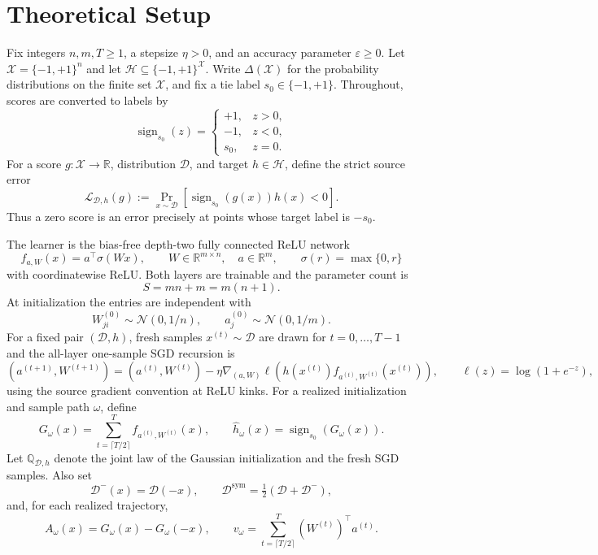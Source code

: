 \section{Theoretical Setup}
\label{sec:setup}

Fix integers $n,m,T\geq 1$, a stepsize $\eta>0$, and an accuracy
parameter $\varepsilon\geq 0$.  Let
$\mathcal X=\{-1,+1\}^{n}$ and let
$\mathcal H\subseteq\{-1,+1\}^{\mathcal X}$.  Write
$\Delta(\mathcal X)$ for the probability distributions on the finite set
$\mathcal X$, and fix a tie label $s_0\in\{-1,+1\}$.  Throughout, scores are
converted to labels by
\[
\operatorname{sign}_{s_0}(z)=
\begin{cases}
 +1,&z>0,\\
 -1,&z<0,\\
 s_0,&z=0.
\end{cases}
\]
For a score $g:\mathcal X\to\mathbb R$, distribution $\mathcal D$, and
target $h\in\mathcal H$, define the strict source error
\[
\mathcal L_{\mathcal D,h}(g)
 :=\Pr_{x\sim\mathcal D}\left[
 \operatorname{sign}_{s_0}(g(x))h(x)<0\right].
\]
Thus a zero score is an error precisely at points whose target label is
$-s_0$.

The learner is the bias-free depth-two fully connected ReLU network
\[
 f_{a,W}(x)=a^\top\sigma(Wx),\qquad
 W\in\mathbb R^{m\times n},\quad a\in\mathbb R^m,
 \qquad \sigma(r)=\max\{0,r\}
\]
with coordinatewise ReLU.  Both layers are trainable and the parameter count
is
\[
 S=mn+m=m(n+1).
\]
At initialization the entries are independent with
\[
 W^{(0)}_{ji}\sim\mathcal N(0,1/n),\qquad
 a^{(0)}_j\sim\mathcal N(0,1/m).
\]
For a fixed pair $(\mathcal D,h)$, fresh samples
$x^{(t)}\sim\mathcal D$ are drawn for $t=0,\ldots,T-1$ and the all-layer
one-sample SGD recursion is
\[
 (a^{(t+1)},W^{(t+1)})=(a^{(t)},W^{(t)})
 -\eta\nabla_{(a,W)}
 \ell\!\left(h(x^{(t)})f_{a^{(t)},W^{(t)}}(x^{(t)})\right),
 \qquad \ell(z)=\log(1+e^{-z}),
\]
using the source gradient convention at ReLU kinks.  For a realized
initialization and sample path $\omega$, define
\[
 G_\omega(x)=\sum_{t=\lceil T/2\rceil}^{T}
 f_{a^{(t)},W^{(t)}}(x),
 \qquad
 \widehat h_\omega(x)=\operatorname{sign}_{s_0}(G_\omega(x)).
\]
Let $\mathbb Q_{\mathcal D,h}$ denote the joint law of the Gaussian
initialization and the fresh SGD samples.  Also set
\[
 \mathcal D^-(x)=\mathcal D(-x),\qquad
 \mathcal D^{\mathrm{sym}}=\tfrac12(\mathcal D+\mathcal D^-),
\]
and, for each realized trajectory,
\[
 A_\omega(x)=G_\omega(x)-G_\omega(-x),\qquad
 v_\omega=\sum_{t=\lceil T/2\rceil}^{T}(W^{(t)})^\top a^{(t)}.
\]

